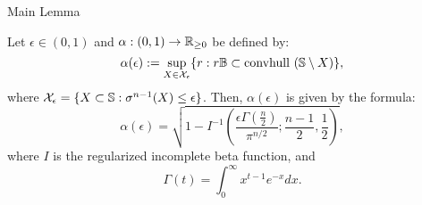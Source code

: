 \begin{subsection}{Main Lemma}
\label{app:eps}



\begin{lemma}\label{lemma:eps}Let $\epsilon \in (0, 1)$ and $\alpha: (0,1) \to \mathbb{R}_{\geq 0}$ be defined by:
\begin{equation}\label{eqn:ballinc}\alpha(\epsilon) := \sup_{X \in \mathcal{X}_\epsilon} \{r: r\mathbb{B} \subset \mbox{convhull }(\mathbb{S} \setminus X)\},
\end{equation}
where $\mathcal{X}_{\epsilon} = \{X \subset \mathbb{S}: \sigma^{n-1}(X) \leq \epsilon\}$. Then, $\alpha(\epsilon)$ is given by the formula:
\begin{equation}\label{eqn:alphaEpsilon}\alpha(\epsilon) = \sqrt{1- I^{-1}\left(\frac{\epsilon\Gamma(\frac{n}{2})}{\pi^{n/2}}; \frac{n-1}{2}, \frac{1}{2}\right)}, \end{equation}
where $I$ is the regularized incomplete beta function, and $$\Gamma(t) = \int_{0}^\infty x^{t-1}e^{-x} dx.$$
\end{lemma}


\end{subsection}
